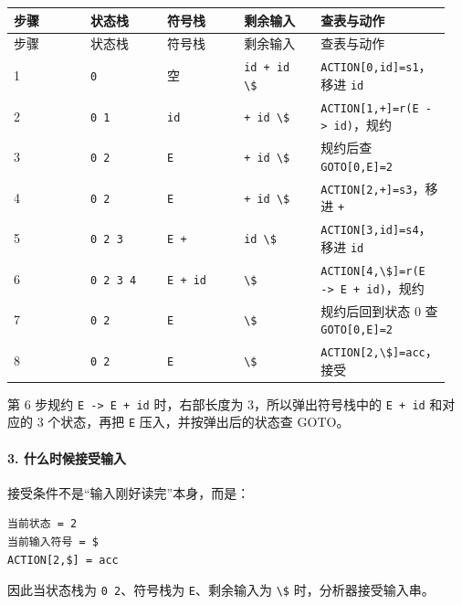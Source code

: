 \documentclass[UTF8]{ctexart}
\begin{document}
\begin{longtable}{|p{0.19\linewidth}|p{0.19\linewidth}|p{0.19\linewidth}|p{0.19\linewidth}|p{0.19\linewidth}|}
\hline
步骤 & 状态栈 & 符号栈 & 剩余输入 & 查表与动作 \\
\hline
\endfirsthead
步骤 & 状态栈 & 符号栈 & 剩余输入 & 查表与动作 \\
\hline
\endhead
1 & \texttt{0} & 空 & \texttt{id + id \textbackslash{}\$} & \texttt{ACTION[0,id]=s1}，移进 \texttt{id} \\
\hline
2 & \texttt{0 1} & \texttt{id} & \texttt{+ id \textbackslash{}\$} & \texttt{ACTION[1,+]=r(E -> id)}，规约 \\
\hline
3 & \texttt{0 2} & \texttt{E} & \texttt{+ id \textbackslash{}\$} & 规约后查 \texttt{GOTO[0,E]=2} \\
\hline
4 & \texttt{0 2} & \texttt{E} & \texttt{+ id \textbackslash{}\$} & \texttt{ACTION[2,+]=s3}，移进 \texttt{+} \\
\hline
5 & \texttt{0 2 3} & \texttt{E +} & \texttt{id \textbackslash{}\$} & \texttt{ACTION[3,id]=s4}，移进 \texttt{id} \\
\hline
6 & \texttt{0 2 3 4} & \texttt{E + id} & \texttt{\textbackslash{}\$} & \texttt{ACTION[4,\textbackslash{}\$]=r(E -> E + id)}，规约 \\
\hline
7 & \texttt{0 2} & \texttt{E} & \texttt{\textbackslash{}\$} & 规约后回到状态 0 查 \texttt{GOTO[0,E]=2} \\
\hline
8 & \texttt{0 2} & \texttt{E} & \texttt{\textbackslash{}\$} & \texttt{ACTION[2,\textbackslash{}\$]=acc}，接受 \\
\hline
\end{longtable}

第 6 步规约 \texttt{E -> E + id} 时，右部长度为 3，所以弹出符号栈中的 \texttt{E + id} 和对应的 3 个状态，再把 \texttt{E} 压入，并按弹出后的状态查 GOTO。

\paragraph*{3. 什么时候接受输入}

接受条件不是“输入刚好读完”本身，而是：

\begin{Verbatim}[fontsize=\small,breaklines=true]
当前状态 = 2
当前输入符号 = $
ACTION[2,$] = acc
\end{Verbatim}

因此当状态栈为 \texttt{0 2}、符号栈为 \texttt{E}、剩余输入为 \texttt{\textbackslash{}\$} 时，分析器接受输入串。
\end{document}
